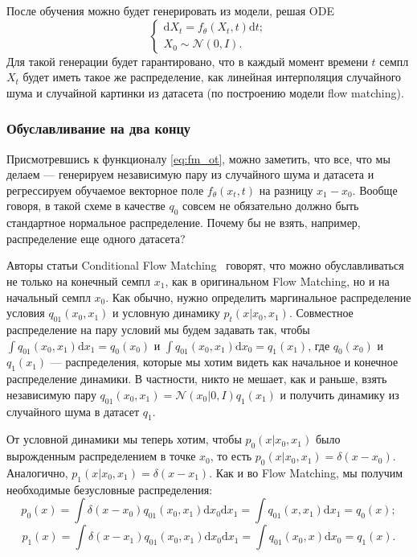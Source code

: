 \documentclass[12pt]{article}
\theoremstyle{definition}
\begin{document}
После обучения можно будет генерировать из модели, решая ODE 
\[
    \begin{cases}
        \mathrm{d} X_t = f_\theta(X_t, t) \mathrm{d} t;\\
        X_0 \sim \mathcal{N}(0, I).
    \end{cases}
\]
Для такой генерации будет гарантировано, что в каждый момент времени $t$ семпл $X_t$ будет иметь такое же распределение, как линейная интерполяция случайного шума и случайной картинки из датасета (по построению модели flow matching).

\subsubsection{Обуславливание на два концу}
Присмотревшись к функционалу \ref{eq:fm_ot}, можно заметить, что все, что мы делаем --- генерируем независимую пару из случайного шума и датасета и регрессируем обучаемое векторное поле $f_\theta(x_t, t)$ на разницу $x_1 - x_0$. Вообще говоря, в такой схеме в качестве $q_0$ совсем не обязательно должно быть стандартное нормальное распределение. Почему бы не взять, например, распределение еще одного датасета?

Авторы статьи Conditional Flow Matching~\cite{tong2023conditional} говорят, что можно обуславливаться не только на конечный семпл $x_1$, как в оригинальном Flow Matching, но и на начальный семпл $x_0$. Как обычно, нужно определить маргинальное распределение условия $q_{01}(x_0, x_1)$ и условную динамику $p_t(x | x_0, x_1)$. Совместное распределение на пару условий мы будем задавать так, чтобы $\int q_{01}(x_0, x_1) \mathrm{d} x_1 = q_0(x_0)$ и $\int q_{01}(x_0, x_1) \mathrm{d} x_0 = q_1(x_1)$, где $q_0(x_0)$ и $q_1(x_1)$ --- распределения, которые мы хотим видеть как начальное и конечное распределение динамики. В частности, никто не мешает, как и раньше, взять независимую пару $q_{01}(x_0, x_1) = \mathcal{N}(x_0 | 0, I) q_1(x_1)$ и получить динамику из случайного шума в датасет $q_1$.


От условной динамики мы теперь хотим, чтобы $p_0(x | x_0, x_1)$ было вырожденным распределением в точке $x_0$, то есть $p_0(x | x_0, x_1) = \delta(x - x_0)$. Аналогично, $p_1(x | x_0, x_1) = \delta(x - x_1)$. Как и во Flow Matching, мы получим необходимые безусловные распределения:
\[
    p_0(x) = \int \delta(x - x_0)q_{01}(x_0, x_1) \mathrm{d}x_0\mathrm{d}x_1 = \int q_{01}(x, x_1) \mathrm{d} x_1 = q_0(x);
\]
\[
    p_1(x) = \int \delta(x - x_1)q_{01}(x_0, x_1) \mathrm{d}x_0\mathrm{d}x_1 = \int q_{01}(x_0, x) \mathrm{d} x_0 = q_1(x).
\]
\end{document}
